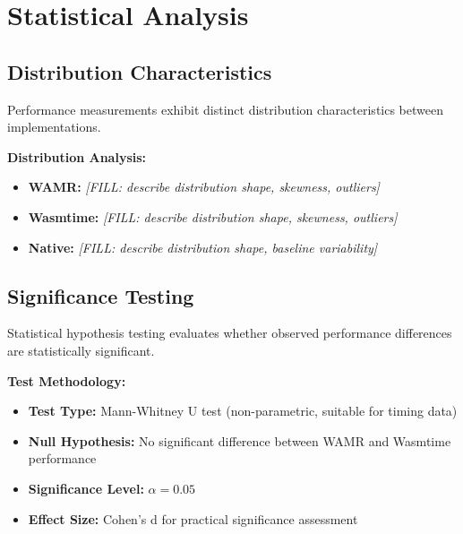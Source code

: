 \section{Statistical Analysis}
\label{sec:statistical-analysis}

\subsection{Distribution Characteristics}
\label{subsec:distribution-analysis}

Performance measurements exhibit distinct distribution characteristics between implementations. 


\textbf{Distribution Analysis:}
\begin{itemize}
    \item \textbf{WAMR:} \textit{[FILL: describe distribution shape, skewness, outliers]}
    \item \textbf{Wasmtime:} \textit{[FILL: describe distribution shape, skewness, outliers]}
    \item \textbf{Native:} \textit{[FILL: describe distribution shape, baseline variability]}
\end{itemize}

\subsection{Significance Testing}
\label{subsec:significance-testing}

Statistical hypothesis testing evaluates whether observed performance differences are statistically significant.

\textbf{Test Methodology:}
\begin{itemize}
    \item \textbf{Test Type:} Mann-Whitney U test (non-parametric, suitable for timing data)
    \item \textbf{Null Hypothesis:} No significant difference between WAMR and Wasmtime performance
    \item \textbf{Significance Level:} $\alpha = 0.05$
    \item \textbf{Effect Size:} Cohen's d for practical significance assessment
\end{itemize}

